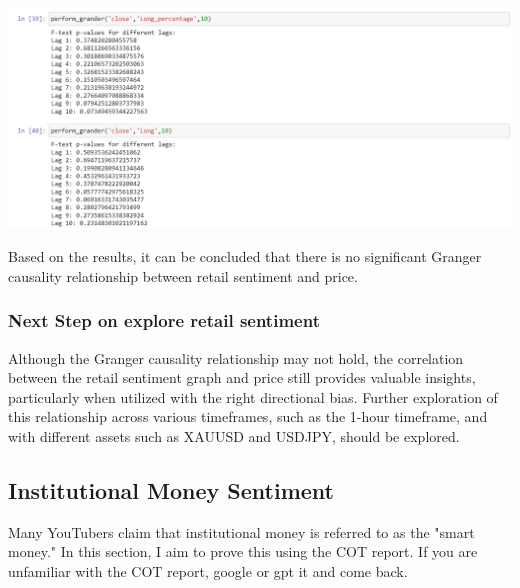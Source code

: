 \documentclass{article}
\begin{document}
\begin{center}
    \includegraphics[scale=0.7]{p7.png}    
\end{center}
Based on the results, it can be concluded that there is no significant Granger causality relationship between retail sentiment and price. \\ 
\subsubsection{Next Step on explore retail sentiment}
Although the Granger causality relationship may not hold, the correlation between the retail sentiment graph and price still provides valuable insights, particularly when utilized with the right directional bias. Further exploration of this relationship across various timeframes, such as the 1-hour timeframe, and with different assets such as XAUUSD and USDJPY, should be explored. 

\subsection{Institutional Money Sentiment}
Many YouTubers claim that institutional money is referred to as the "smart money." In this section, I aim to prove this using the COT report. If you are unfamiliar with the COT report, google or gpt it and come back.
\end{document}
